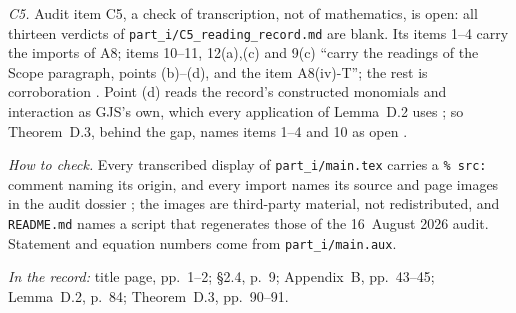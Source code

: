 \emph{C5.} Audit item C5, a check of transcription, not of mathematics, is open: all
thirteen verdicts of \texttt{part\_i/\allowbreak C5\_reading\_record.md} are blank. Its
items 1--4 carry the imports of A8; items 10--11, 12(a),(c) and 9(c) ``carry the readings of
the Scope paragraph, points (b)--(d), and the item A8(iv)-T''; the rest is corroboration
. Point (d) reads the record's constructed
monomials and interaction as GJS's own, which every application of Lemma~D.2 uses
; so Theorem~D.3, behind the gap, names items 1--4 and 10 as open
.

\emph{How to check.} Every transcribed display of \texttt{part\_i/main.tex} carries a
\texttt{\% src:} comment naming its origin, and every import names its source and page
images in the audit dossier ; the images are third-party material, not
redistributed, and \texttt{README.md} names a script that regenerates those of the
16~August 2026 audit. Statement and equation numbers come from \texttt{part\_i/main.aux}.

\noindent\emph{In the record:} title page, pp.~1--2; \S2.4, p.~9; Appendix~B, pp.~43--45;
Lemma~D.2, p.~84; Theorem~D.3, pp.~90--91.
